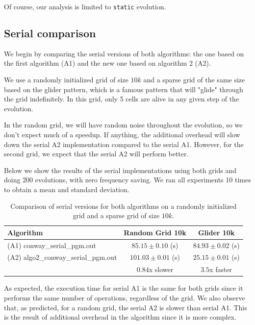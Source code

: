 \documentclass{report}
\begin{document}
Of course, our analysis is limited to \texttt{static} evolution.

\subsection{Serial comparison}

We begin by comparing the serial versions of both algorithms: the one based on 
the first algorithm (A1) and the new one based on algorithm 2 (A2). 

We use a randomly initialized grid of size $10k$ and a sparse grid of the same 
size based on the glider pattern\cite{glider}, which is a famous pattern that 
will "glide" through the grid indefinitely. In this grid, only 5 cells are alive 
in any given step of the evolution.

In the random grid, we will have random noise throughout the evolution, so we 
don't expect much of a speedup. If anything, the additional overhead will slow 
down the serial A2 implementation compared to the serial A1. However, for the 
second grid, we expect that the serial A2 will perform better. 

Below we show the results of the serial implementations using both grids and doing 
200 evolutions, with zero frequency saving. We ran all experiments 10 times to 
obtain a mean and standard deviation.

\begin{table}[H]
\centering
\begin{tabular}{|l|c|c|}
    \hline
    Algorithm                      &   Random Grid 10k       & Glider 10k             \\ \hline
    (A1) conway\_serial\_pgm.out        &   $85.15 \pm 0.10$ (s)  & $84.93 \pm 0.02$ (s)   \\
    (A2) algo2\_conway\_serial\_pgm.out &   $101.03 \pm 0.01$ (s) & $25.15 \pm 0.01$ (s)   \\ \hline
                                   &   $0.84$x slower        & $ 3.5$x faster         \\ \hline
\end{tabular}
\caption{\label{tab:a2serial}Comparison of serial versions for both algorithms on a randomly 
initialized grid and a sparse grid of size $10k$.}
\end{table}

As expected, the execution time for serial A1 is the same for both grids since 
it performs the same number of operations, regardless of the grid. We also observe 
that, as predicted, for a random grid, the serial A2 is slower than serial A1. 
This is the result of additional overhead in the algorithm since it is more complex.
\end{document}
